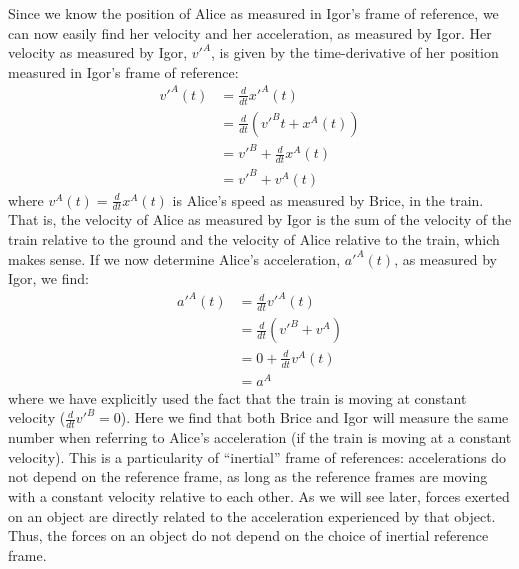 Since we know the position of Alice as measured in Igor's frame of reference, we can now easily find her velocity and her acceleration, as measured by Igor. Her velocity as measured by Igor, $v'^A$, is given by the time-derivative of her position measured in Igor's frame of reference:
\begin{align}
v'^A(t)&=\frac{d}{dt}x'^A(t)\\
&=\frac{d}{dt}(v'^Bt+x^A(t))\\
&=v'^B+\frac{d}{dt}x^A(t)\\
&=v'^B+v^A(t)
\end{align}
where $v^A(t)=\frac{d}{dt}x^A(t)$ is Alice's speed as measured by Brice, in the train. That is, the velocity of Alice as measured by Igor is the sum of the velocity of the train relative to the ground and the velocity of Alice relative to the train, which makes sense. If we now determine Alice's acceleration, $a'^A(t)$, as measured by Igor, we find:
\begin{align}
a'^A(t)&=\frac{d}{dt}v'^A(t)\\
&=\frac{d}{dt}(v'^B+v^A)\\
&=0+\frac{d}{dt}v^A(t)\\
&=a^A
\end{align}
where we have explicitly used the fact that the train is moving at constant velocity ($\frac{d}{dt}v'^B=0$). Here we find that both Brice and Igor will measure the same number when referring to Alice's acceleration (if the train is moving at a constant velocity). This is a particularity of ``inertial'' frame of references: accelerations do not depend on the reference frame, as long as the reference frames are moving with a constant velocity relative to each other. As we will see later, forces exerted on an object are directly related to the acceleration experienced by that object. Thus, the forces on an object do not depend on the choice of inertial reference frame. 

